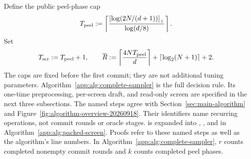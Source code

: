 Define the public peel-phase cap
\begin{equation}
 T_{\mathrm{peel}}
 :=\left\lceil
 \frac{\left[\log(2N/(d+1))\right]_+}
      {\log(d/8)}
 \right\rceil.
 \label{app:eq:phase-cap}
\end{equation}
Set
\begin{equation}
 T_{\mathrm{scr}}:=T_{\mathrm{peel}}+1,
 \qquad
 \overline R
 :=\left\lceil\frac{4NT_{\mathrm{peel}}}{d}\right\rceil
   +\left\lceil\log_2(N+1)\right\rceil+2.
 \label{app:eq:screen-call-and-round-caps}
\end{equation}
The caps are fixed before the first commit; they are not additional tuning
parameters.  Algorithm~\ref{app:alg:complete-sampler} is the full decision rule.
Its one-time preprocessing, per-screen draft, and read-only screen are
specified in the next three subsections.
The named steps agree with Section~\ref{sec:main-algorithm} and
Figure~\ref{fig:algorithm-overview-20260918}.
Their identifiers name recurring operations, not commit rounds or oracle stages.
 is expanded into
, , and 
in Algorithm~\ref{app:alg:packed-screen}.
Proofs refer to these named steps as well as the algorithm's line numbers.
In Algorithm~\ref{app:alg:complete-sampler}, $r$ counts completed nonempty
commit rounds and $k$ counts completed peel phases.

